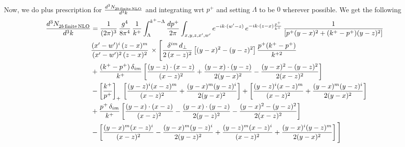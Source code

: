 \documentclass[9pt]{article}
\numberwithin{equation}{section}
\begin{document}
\begin{align}
\end{align}
Now, we do plus prescription for $\frac{d^{3}N_{2b\,\rm finite\, NLO}^{\rm}}{d^{3}k}$ and integrating wrt $p^{+}$ and setting $\Lambda$ to be $0$ wherever possible. We get the following
\begin{align}
    \frac{d^{3}N_{2b\,\rm finite\, NLO}^{\rm}}{d^{3}k} & = \frac{1}{(2\pi)^{3}}\,\frac{g^{4}}{8\pi^{4}}\,\frac{1}{k^{+}}\int_{\Lambda}^{k^{+}-\Lambda}\frac{dp^{+}}{2\pi}\int_{x,y,z,x',w'}e^{-ik\cdot(w'-z)}\,e^{-ik\cdot(z-x)\frac{p^{+}}{k^{+}}}\,\frac{1}{\left[p^{+}(y-x)^{2}+(k^{+}-p^{+})(y-z)^{2}\right]}\notag \\ & \frac{(x'-w')^{i}\,(z-x)^{m}}{(x'-w')^{2}\,(z-x)^{2}}\,\times\Bigg[\frac{\delta^{im}\,d_{\perp}}{2\,(x-z)^{2}}\left[(y-x)^{2}-(y-z)^{2}\right]\frac{p^{+}(k^{+}-p^{+})}{k^{+2}}
\notag \\ & +\frac{(k^{+}-p^{+})\,\delta_{im}}{k^{+}}\left[\frac{(y-z)\cdot(x-z)}{(x-z)^{2}}+\frac{(y-x)\cdot(y-z)}{2(y-x)^{2}}-\frac{(y-x)^{2}-(y-z)^{2}}{2(x-z)^{2}}\right]\notag\\
&-\left[\frac{k^{+}}{p^{+}}\right]_{+}\,\left[\frac{(y-z)^{i}(x-z)^{m}}{(x-z)^{2}}+\frac{(y-x)^{m}(y-z)^{i}}{2(y-x)^{2}}\right]+\left[\frac{(y-z)^{i}(x-z)^{m}}{(x-z)^{2}}+\frac{(y-x)^{m}(y-z)^{i}}{2(y-x)^{2}}\right]\notag\\
&+\frac{p^{+}\,\delta_{im}}{k^{+}}\left[\frac{(y-x)\cdot(x-z)}{(x-z)^{2}}-\frac{(y-x)\cdot(y-z)}{2(y-z)^{2}}-\frac{(y-x)^{2}-(y-z)^{2}}{2(x-z)^{2}}\right]\notag\\
&-\left[\frac{(y-x)^{m}(x-z)^{i}}{(x-z)^{2}}-\frac{(y-x)^{m}(y-z)^{i}}{2(y-z)^{2}}+\frac{(y-z)^{m}(x-z)^{i}}{(x-z)^{2}}+\frac{(y-x)^{i}(y-z)^{m}}{2(y-x)^{2}}\right]\Bigg]\notag\\

\end{align}
\end{document}
